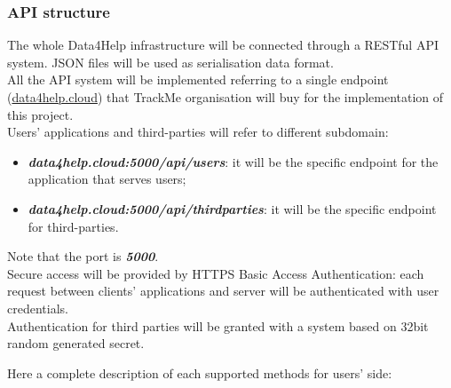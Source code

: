 \documentclass[DD.tex]{subfiles}
\begin{document}
\newpage

\subsubsection{API structure}
The whole Data4Help infrastructure will be connected through a RESTful API system. JSON files will be used as serialisation data format.\\
All the API system will be implemented referring to a single endpoint (\url{data4help.cloud}) that TrackMe organisation will buy for the implementation of this project.
\\Users' applications and third-parties will refer to different subdomain:

\begin{itemize}
	\item \textit{\textbf{data4help.cloud:5000/api/users}}: it will be the specific endpoint for the application that serves users;
	\item \textit{\textbf{data4help.cloud:5000/api/thirdparties}}: it will be the specific endpoint for third-parties.
\end{itemize}

Note that the port is \textit{\textbf{5000}}.\\
Secure access will be provided by HTTPS Basic Access Authentication: each request between clients' applications and server will be authenticated with user credentials.
\\Authentication for third parties will be granted with a system based on 32bit random generated secret.

Here a complete description of each supported methods for users' side:
\end{document}
